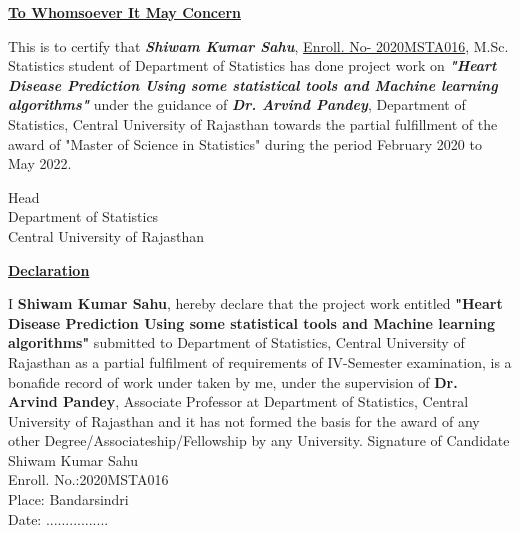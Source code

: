 \documentclass[12pt]{article}
\begin{document}
\begin{doublespace}
\begin{center}
\begin{Large}
\underline{\textbf{To Whomsoever It May Concern}}

\end{Large}
\end{center}
\vspace{10mm}
This is to certify that \textbf{\textit{Shiwam Kumar Sahu}}, \underline{Enroll. No- 2020MSTA016}, M.Sc. Statistics student of Department of Statistics has done project work on \textbf{\textit{"Heart Disease Prediction Using some statistical tools and Machine learning algorithms"}} under the guidance of  \textbf{\textit{Dr. Arvind Pandey}}, Department of Statistics, Central University of Rajasthan towards the partial fulfillment of the award of "Master of Science in Statistics" during the period February 2020 to May 2022.
\vspace{15mm}
\begin{flushright}
Head\\
Department of Statistics\\
Central University of Rajasthan
\end{flushright}
\newpage
\begin{center}
\begin{Large}
\underline{\textbf{Declaration}}

\end{Large}
\end{center}I  \textbf{Shiwam Kumar Sahu}, hereby declare that the project work entitled \textbf{"Heart Disease Prediction Using some statistical tools and Machine learning algorithms"} submitted to Department of Statistics, Central University of Rajasthan as a partial fulfilment of requirements of IV-Semester examination, is a bonafide record of work under taken by me, under the supervision of \textbf{Dr. Arvind Pandey}, Associate Professor at Department of Statistics, Central University of Rajasthan and it has not formed the basis for the award of any other Degree/Associateship/Fellowship by any University.
\vspace{15mm}
\flushright
Signature of Candidate\\
Shiwam Kumar Sahu\\
Enroll. No.:2020MSTA016 \\
\flushleft
Place: Bandarsindri\\
Date:  ................

\end{doublespace}
\end{document}
